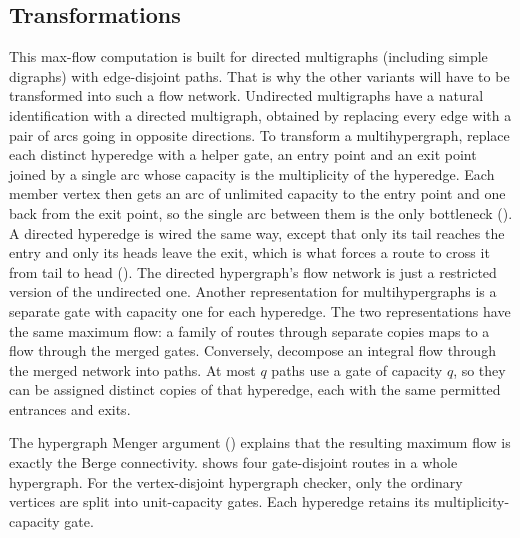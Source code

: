 \subsection{Transformations}
This max-flow computation is built for directed multigraphs (including simple digraphs) with edge-disjoint paths.
That is why the other variants will have to be transformed into such a flow network.
Undirected multigraphs have a natural identification with a directed multigraph, obtained by replacing every edge with a pair of arcs going in opposite directions.
To transform a multihypergraph, replace each distinct hyperedge with a helper gate,
an entry point and an exit point joined by a single arc whose capacity is the multiplicity of the hyperedge.
Each member vertex then gets an arc of unlimited capacity to the entry point and one back from the exit point,
so the single arc between them is the only bottleneck ().
A directed hyperedge is wired the same way, except that only its tail reaches the entry and only its heads leave the exit,
which is what forces a route to cross it from tail to head ().
The directed hypergraph's flow network is just a restricted version of the undirected one.
Another representation for multihypergraphs is a separate gate with capacity one for each hyperedge.
The two representations have the same maximum flow: a family of routes through
separate copies maps to a flow through the merged gates. Conversely, decompose
an integral flow through the merged network into paths. At most $q$ paths use
a gate of capacity $q$, so they can be assigned distinct copies of that
hyperedge, each with the same permitted entrances and exits.

The hypergraph Menger argument () explains that the resulting maximum flow is exactly the Berge connectivity.
 shows four gate-disjoint routes in a whole hypergraph.
For the vertex-disjoint hypergraph checker, only the ordinary vertices are split into unit-capacity gates. Each hyperedge retains its multiplicity-capacity gate.

